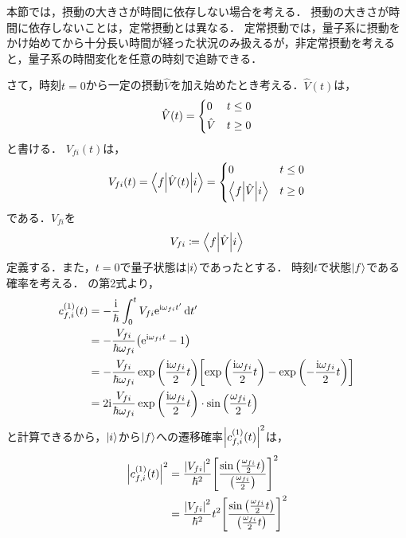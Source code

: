 \documentclass{report}
\begin{document}
  本節では，摂動の大きさが時間に依存しない場合を考える．
  摂動の大きさが時間に依存しないことは，定常摂動とは異なる．
  定常摂動では，量子系に摂動をかけ始めてから十分長い時間が経った状況のみ扱えるが，非定常摂動を考えると，量子系の時間変化を任意の時刻で追跡できる．
  \par
  さて，時刻$t = 0$から一定の摂動$\hat{V}$を加え始めたとき考える．$\hat{V}(t)$は，
  \begin{align}
    \hat{V}(t) =
    \begin{dcases}
      0 & t \leq 0 \\
      \hat{V} & t \geq 0
    \end{dcases}
  \end{align}
  と書ける．
  $V_{fi}(t)$は，
  \begin{align}
    V_{fi}(t) = \mel**{f}{\hat{V}(t)}{i} =
    \begin{dcases}
      0 & t \leq 0 \\
      \mel**{f}{\hat{V}}{i} & t \geq 0
    \end{dcases}
  \end{align}
  である．$V_{fi}$を
  \begin{align}
    V_{fi} \coloneqq \mel**{f}{\hat{V}}{i}
  \end{align}
  定義する．また，$t = 0$で量子状態は$\ket{i}$であったとする．
  時刻$t$で状態$\ket{f}$である確率を考える．
  の第2式より，
  \begin{align}
    c_{f, i}^{(1)}(t) &= -\frac{\mathrm{i}}{\hbar}\int_{0}^{t}V_{fi}\mathrm{e}^{\mathrm{i}\omega_{fi}t'}\dd{t'} \\
    &= -\frac{V_{fi}}{\hbar\omega_{fi}}\qty(\mathrm{e}^{\mathrm{i}\omega_{fi}t} - 1) \\ 
    &= -\frac{V_{fi}}{\hbar\omega_{fi}}\exp\qty(\frac{\mathrm{i}\omega_{fi}}{2}t)\qty[\exp\qty(\frac{\mathrm{i}\omega_{fi}}{2}t) - \exp\qty(-\frac{\mathrm{i}\omega_{fi}}{2}t)] \\ 
    &= 2\mathrm{i}\frac{V_{fi}}{\hbar\omega_{fi}}\exp\qty(\frac{\mathrm{i}\omega_{fi}}{2}t)\cdot\sin\qty(\frac{\omega_{fi}}{2}t)
  \end{align}
  と計算できるから，$\ket{i}$から$\ket{f}$への遷移確率$\abs{c_{f, i}^{(1)}(t)}^2$は，
  \begin{align}
    \abs{c_{f, i}^{(1)}(t)}^2 &= \frac{\abs{V_{fi}}^2}{\hbar^2}\qty[\frac{\sin\qty(\frac{\omega_{fi}}{2}t)}{\qty(\frac{\omega_{fi}}{2})}]^2 \\ 
    &= \frac{\abs{V_{fi}}^2}{\hbar^2}t^2\qty[\frac{\sin\qty(\frac{\omega_{fi}}{2}t)}{\qty(\frac{\omega_{fi}}{2}t)}]^2 \label{v-const-cfi-t}
  \end{align}
\end{document}

